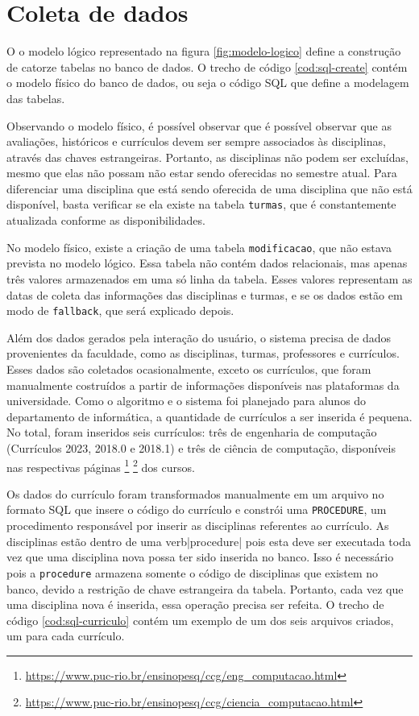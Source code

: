 \section{Coleta de dados}
\label{sec:Coleta de dados}

O o modelo lógico representado na figura \ref{fig:modelo-logico} define a construção de catorze tabelas no banco de dados. O trecho de código \ref{cod:sql-create} contém o modelo físico do banco de dados, ou seja o código SQL que define a modelagem das tabelas.



Observando o modelo físico, é possível observar que é possível observar que as avaliações, históricos e currículos devem ser sempre associados às disciplinas, através das chaves estrangeiras. Portanto, as disciplinas não podem ser excluídas, mesmo que elas não possam não estar sendo oferecidas no semestre atual. Para diferenciar uma disciplina que está sendo oferecida de uma disciplina que não está disponível, basta verificar se ela existe na tabela \verb|turmas|, que é constantemente atualizada conforme as disponibilidades.

No modelo físico, existe a criação de uma tabela \verb|modificacao|, que não estava prevista no modelo lógico. Essa tabela não contém dados relacionais, mas apenas três valores armazenados em uma só linha da tabela. Esses valores representam as datas de coleta das informações das disciplinas e turmas, e se os dados estão em modo de \verb|fallback|, que será explicado depois.

Além dos dados gerados pela interação do usuário, o sistema precisa de dados provenientes da faculdade, como as disciplinas, turmas, professores e currículos. Esses dados são coletados ocasionalmente, exceto os currículos, que foram manualmente costruídos a partir de informações disponíveis nas plataformas da universidade. Como o algoritmo e o sistema foi planejado para alunos do departamento de informática, a quantidade de currículos a ser inserida é pequena. No total, foram inseridos seis currículos: três de engenharia de computação (Currículos 2023, 2018.0 e 2018.1) e três de ciência de computação, disponíveis nas respectivas páginas
\footnote{\url{https://www.puc-rio.br/ensinopesq/ccg/eng_computacao.html}}
\footnote{\url{https://www.puc-rio.br/ensinopesq/ccg/ciencia_computacao.html}}
dos cursos.

Os dados do currículo foram transformados manualmente em um arquivo no formato SQL que insere o código do currículo e constrói uma \verb|PROCEDURE|, um procedimento responsável por inserir as disciplinas referentes ao currículo. As disciplinas estão dentro de uma verb|procedure| pois esta deve ser executada toda vez que uma disciplina nova possa ter sido inserida no banco. Isso é necessário pois a \verb|procedure| armazena somente o código de disciplinas que existem no banco, devido a restrição de chave estrangeira da tabela. Portanto, cada vez que uma disciplina nova é inserida, essa operação precisa ser refeita. O trecho de código \ref{cod:sql-curriculo} contém um exemplo de um dos seis arquivos criados, um para cada currículo.

